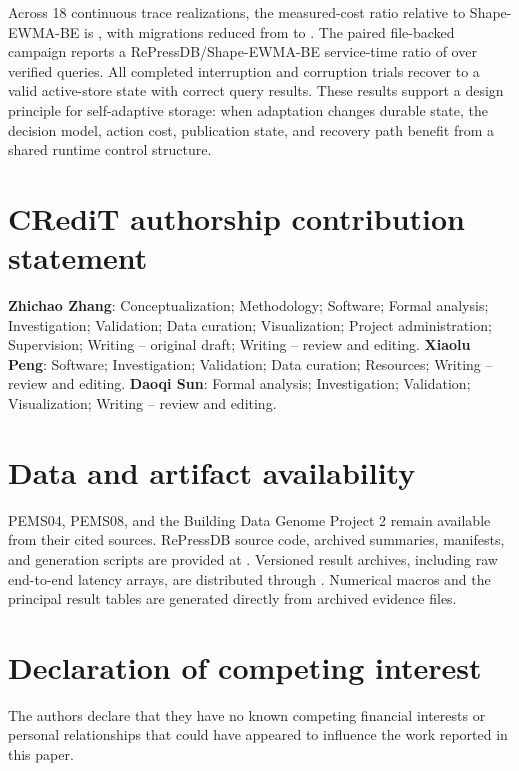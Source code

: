 \documentclass[final,5p,times,twocolumn,authoryear]{elsarticle}
\begin{document}
Across 18 continuous trace realizations, the measured-cost ratio relative to Shape-EWMA-BE is \ReplayRepressShapeRatio{}, with migrations reduced from \ReplayShapeMigrations{} to \ReplayRepressMigrations. The paired file-backed campaign reports a RePressDB/Shape-EWMA-BE service-time ratio of \EndToEndRepressShapeRatio{} over \EndToEndQueries{} verified queries. All \CombinedRecoveryTrials{} completed interruption and corruption trials recover to a valid active-store state with correct query results. These results support a design principle for self-adaptive storage: when adaptation changes durable state, the decision model, action cost, publication state, and recovery path benefit from a shared runtime control structure.

\section*{CRediT authorship contribution statement}

\textbf{Zhichao Zhang}: Conceptualization; Methodology; Software; Formal analysis; Investigation; Validation; Data curation; Visualization; Project administration; Supervision; Writing -- original draft; Writing -- review and editing. \textbf{Xiaolu Peng}: Software; Investigation; Validation; Data curation; Resources; Writing -- review and editing. \textbf{Daoqi Sun}: Formal analysis; Investigation; Validation; Visualization; Writing -- review and editing.

\section*{Data and artifact availability}

PEMS04, PEMS08, and the Building Data Genome Project 2 remain available from their cited sources. RePressDB source code, archived summaries, manifests, and generation scripts are provided at \href{\ArtifactRepositoryURL}{\ArtifactRepositoryURLText}. Versioned result archives, including raw end-to-end latency arrays, are distributed through \href{\ArtifactReleaseURL}{\ArtifactReleaseURLText}. Numerical macros and the principal result tables are generated directly from archived evidence files.

\section*{Declaration of competing interest}

The authors declare that they have no known competing financial interests or personal relationships that could have appeared to influence the work reported in this paper.
\end{document}
